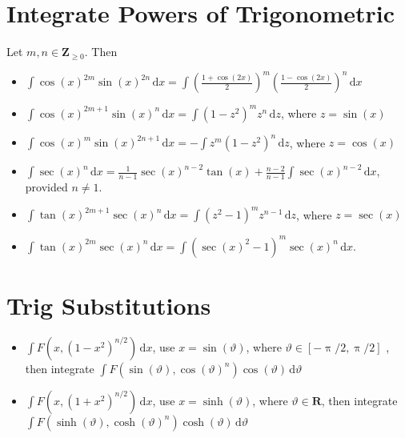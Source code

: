 \documentclass[letterpaper,landscape,9pt,fleqn]{extarticle}
\newcommand{\reals}{\mathbf{R}}
\newcommand{\integers}{\mathbf{Z}}
\begin{document}
\begin{multicols*}{2}
\section*{Integrate Powers of Trigonometric}
\vspace{0.1in}
Let $m,n \in \integers_{\geq 0}$. Then

\begin{itemize}[noitemsep]
  \item $\int \cos(x)^{2m} \sin(x)^{2n} \, \mathrm{d}x
         = \int \left(\frac{1+\cos(2 x)}{2}\right)^m 
                 \left(\frac{1-\cos(2 x)}{2}\right)^n 
                 \, \mathrm{d}x$

  \item $\int \cos(x)^{2m+1} \sin(x)^{n} \, \mathrm{d}x
  = \int (1-z^2)^m  z^{n}
             \, \mathrm{d}z$,  where $z = \sin(x)$

  \item $\int \cos(x)^{m} \sin(x)^{2n+1} \, \mathrm{d}x
             = -\int z^m (1-z^2)^n \, \mathrm{d}z$,  
             where $z = \cos(x)$

\item $\int \sec(x)^n \, \mathrm{d} x = \frac{1}{n-1} \sec(x)^{n-2} \tan(x) + \frac{n-2}{n-1} \int \sec(x)^{n-2} \, \mathrm{d} x$,
provided $n \neq 1$.
\item $\int \tan(x)^{2m+1} \sec(x)^n \, \mathrm{d} x =  \int (z^2-1)^m z^{n-1} \, \mathrm{d} z$,
where $z=\sec(x)$

\item $\int \tan(x)^{2m} \sec(x)^n \, \mathrm{d} x  = \int (\sec(x)^2-1)^m \sec(x)^n \, \mathrm{d} x$.


\end{itemize}
              \vspace{0.050in}
\section*{Trig Substitutions}
\vspace{0.25in}
\begin{itemize}[noitemsep]
\item $\int F \left(x, \left(1-x^2\right)^{n/2}\right) \, \mathrm{d} x$, 
use $x = \sin(\vartheta)$, where  $\vartheta \in [-\uppi/2, \uppi/2]$
, then integrate $\int F \left(\sin(\vartheta),\cos(\vartheta)^n\right) \cos(\vartheta) \, \mathrm{d} \vartheta$
\item  $\int F\left(x, \left (1+x^2 \right)^{n/2}\right) \, 
\mathrm{d} x$, use $x = \sinh(\vartheta)$,
where $\vartheta \in \reals$, then integrate
$\int F\left(\sinh(\vartheta), \cosh(\vartheta)^n \right)  \cosh(\vartheta)\, \mathrm{d} \vartheta$


\end{itemize}
\end{multicols*}
\end{document}
